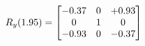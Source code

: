 \documentclass[preview]{standalone}
\begin{document}
\begin{align*}
\special{dvisvgm:raw <g id='unique000'>}R_{y}(1.95) = \begin{bmatrix}-0.37 & 0 & +0.93 \\0 & 1 & 0 \\-0.93 & 0 & -0.37\end{bmatrix}\special{dvisvgm:raw </g>}
\end{align*}
\end{document}
